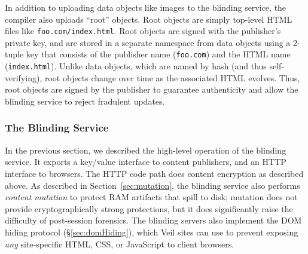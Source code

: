 In addition to uploading data objects like
images to the blinding service, the compiler
also uploads ``root'' objects. Root objects
are simply top-level HTML files like \texttt{foo.com/index.html}.
Root objects are signed with the publisher's
private key, and are stored in a separate
namespace from data objects using a 2-tuple
key that consists of the publisher name
(\texttt{foo.com}) and the HTML name
(\texttt{index.html}). Unlike data objects,
which are named by hash (and thus self-verifying),
root objects change over time as the associated
HTML evolves. Thus, root objects are
signed by the publisher to guarantee
authenticity and allow the blinding service
to reject fradulent updates.


\subsubsection{The Blinding Service}
\label{sec:bservs}

In the previous section, we described the
high-level operation of the blinding service.
It exports a key/value interface to content
publishers, and an HTTP interface to browsers.
The HTTP code path does content encryption
as described above. As described in
Section~\ref{sec:mutation}, the blinding
service also performs \emph{content mutation}
to protect RAM artifacts that spill to disk;
mutation does not provide cryptographically
strong protections, but it does significantly
raise the difficulty of post-session forensics.
The blinding servers also implement the DOM
hiding protocol (\S\ref{sec:domHiding}), which
Veil sites can use to prevent exposing \emph{any}
site-specific HTML, CSS, or JavaScript to client
browsers.


